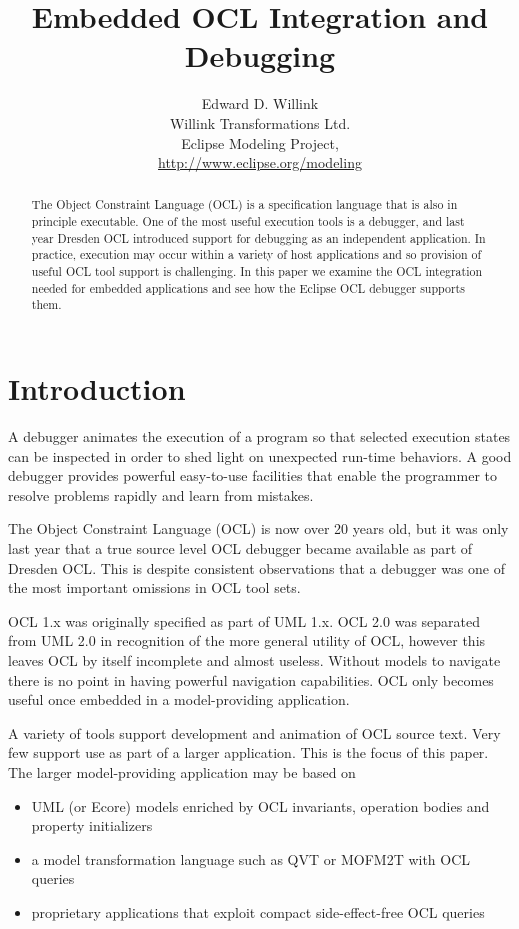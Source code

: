 \documentclass[a4paper]{article}
\title{Embedded OCL Integration and Debugging}
\author{
Edward D. Willink \\ Willink Transformations Ltd.\\
                Eclipse Modeling Project, \\ \url{http://www.eclipse.org/modeling}
}
\begin{document}
\maketitle

\begin{abstract}
The Object Constraint Language (OCL) is a specification language that is also in principle executable. One of the most useful execution tools is a debugger, and last year Dresden OCL introduced support for debugging as an independent application.  In practice, execution may occur within a variety of host applications and so provision of useful OCL tool support is challenging. In this paper we examine the OCL integration needed for embedded applications and see how the Eclipse OCL debugger supports them.  
\end{abstract}
\vskip 32pt

\section{Introduction}
A debugger animates the execution of a program so that selected execution states can be inspected in order to shed light on unexpected run-time behaviors. A good debugger provides powerful easy-to-use facilities that enable the programmer to resolve problems rapidly and learn from mistakes.

The Object Constraint Language (OCL)\cite{OCL-2.4} is now over 20 years old, but it was only last year that a true source level OCL debugger became available as part of Dresden OCL\cite{DresdenOCL-Debug}. This is despite consistent observations that a debugger was one of the most important omissions in OCL tool sets\cite{Chimiak-Opaka}.

OCL 1.x was originally specified as part of UML 1.x. OCL 2.0 was separated from UML 2.0 in recognition of the more general utility of OCL, however this leaves OCL by itself incomplete and almost useless. Without models to navigate there is no point in having powerful navigation capabilities. OCL only becomes useful once embedded in a model-providing application.

A variety of tools support development and animation of OCL source text. Very few support use as part of a larger application. This is the focus of this paper. The larger model-providing application may be based on 

\begin{itemize}
\item UML\cite{UML-2.5} (or Ecore\cite{EMF}) models enriched by OCL invariants, operation bodies and property initializers
\item a model transformation language such as QVT\cite{QVT-1.2} or MOFM2T\cite{MOFM2T} with OCL queries
\item proprietary applications that exploit compact side-effect-free OCL queries
\end{itemize}
\end{document}
